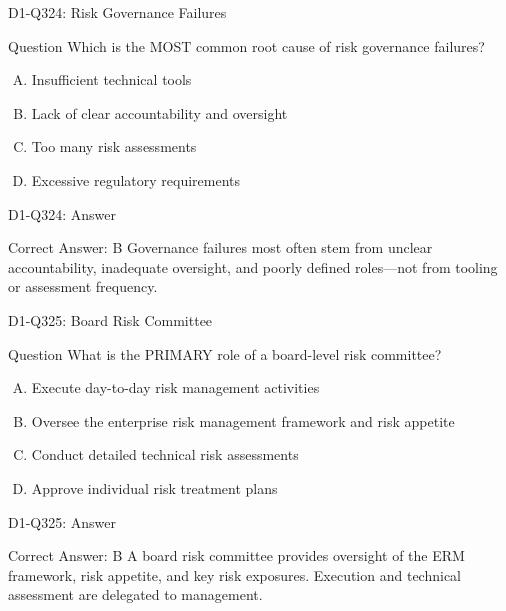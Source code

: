 \documentclass{beamer}
\begin{document}
\begin{frame}{D1-Q324: Risk Governance Failures}
	\begin{block}{Question}
		Which is the MOST common root cause of risk governance failures?
	\end{block}
	\begin{enumerate}[(A)]
		\item Insufficient technical tools
		\item Lack of clear accountability and oversight
		\item Too many risk assessments
		\item Excessive regulatory requirements
	\end{enumerate}
\end{frame}
\begin{frame}{D1-Q324: Answer}
	\begin{block}{Correct Answer: B}
		Governance failures most often stem from unclear accountability, inadequate oversight, and poorly defined roles—not from tooling or assessment frequency.
	\end{block}
\end{frame}

\begin{frame}{D1-Q325: Board Risk Committee}
	\begin{block}{Question}
		What is the PRIMARY role of a board-level risk committee?
	\end{block}
	\begin{enumerate}[(A)]
		\item Execute day-to-day risk management activities
		\item Oversee the enterprise risk management framework and risk appetite
		\item Conduct detailed technical risk assessments
		\item Approve individual risk treatment plans
	\end{enumerate}
\end{frame}
\begin{frame}{D1-Q325: Answer}
	\begin{block}{Correct Answer: B}
		A board risk committee provides oversight of the ERM framework, risk appetite, and key risk exposures. Execution and technical assessment are delegated to management.
	\end{block}
\end{frame}
\end{document}
